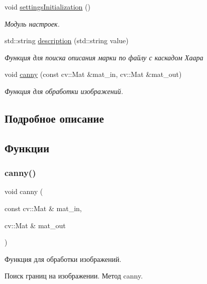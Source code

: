 \begin{DoxyCompactItemize}
void \mbox{\hyperlink{group__coreh_ga242d25c7a9a1b7212bb890023c8131f5}{settings\+Initialization}} ()
\begin{DoxyCompactList}\small\item\em Модуль настроек. \end{DoxyCompactList}\item 
std\+::string \mbox{\hyperlink{group__coreh_gaad0390ab7aa8f0cac1eee4492e919baf}{description}} (std\+::string value)
\begin{DoxyCompactList}\small\item\em Функция для поиска описания марки по файлу с каскадом Хаара \end{DoxyCompactList}\item 
void \mbox{\hyperlink{group__coreh_gaff2d42310702a0aab15af5ad62a59f2b}{canny}} (const cv\+::\+Mat \&mat\+\_\+in, cv\+::\+Mat \&mat\+\_\+out)
\begin{DoxyCompactList}\small\item\em Функция для обработки изображений. \end{DoxyCompactList}\end{DoxyCompactItemize}


\subsection{Подробное описание}


\subsection{Функции}
\mbox{\label{group__coreh_gaff2d42310702a0aab15af5ad62a59f2b}} 
\subsubsection{\texorpdfstring{canny()}{canny()}}
{\footnotesize\ttfamily void canny (\begin{DoxyParamCaption}\item[{const cv\+::\+Mat \&}]{mat\+\_\+in,  }\item[{cv\+::\+Mat \&}]{mat\+\_\+out }\end{DoxyParamCaption})}



Функция для обработки изображений. 

Поиск границ на изображении. Метод canny.


